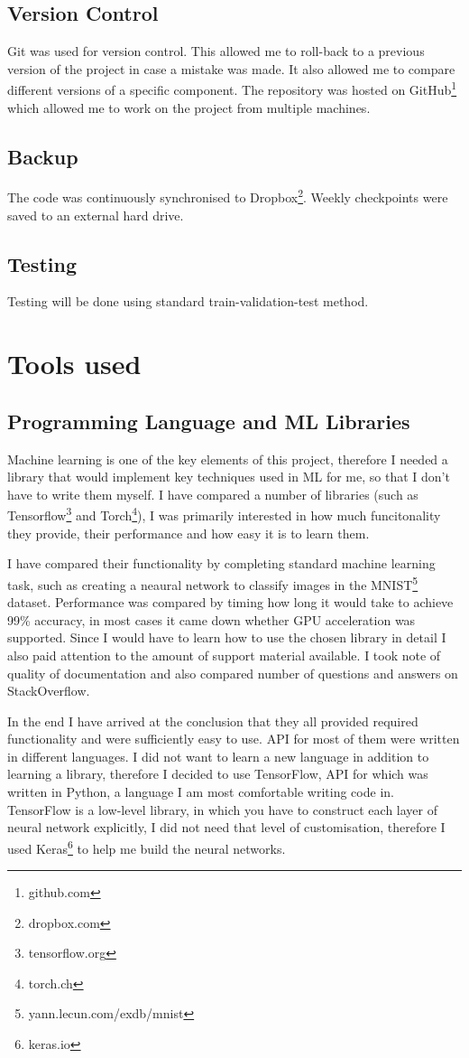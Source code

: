 \documentclass[12pt,a4paper]{book}
\begin{document}
\subsection{Version Control}
Git was used for version control.
This allowed me to roll-back to a previous version of the project in case a mistake was made.
It also allowed me to compare different versions of a specific component.
The repository was hosted on GitHub\footnote{github.com} which allowed me to work on the project from multiple machines.
\subsection{Backup}
The code was continuously synchronised to Dropbox\footnote{dropbox.com}.
Weekly checkpoints were saved to an external hard drive.
\subsection{Testing}
Testing will be done using standard train-validation-test method.
\section{Tools used}
\subsection{Programming Language and ML Libraries}
Machine learning is one of the key elements of this project, therefore I needed a library that would implement key techniques used in ML for me, so that I don't have to write them myself.
I have compared a number of libraries (such as Tensorflow\footnote{tensorflow.org} and Torch\footnote{torch.ch}), I was primarily interested in how much funcitonality they provide, their performance and how easy it is to learn them.

I have compared their functionality by completing standard machine learning task, such as creating a neaural network to classify images in the MNIST\footnote{yann.lecun.com/exdb/mnist} dataset.
Performance was compared by timing how long it would take to achieve 99\% accuracy, in most cases it came down whether GPU acceleration was supported.
Since I would have to learn how to use the chosen library in detail I also paid attention to the amount of support material available.
I took note of quality of documentation and also compared number of questions and answers on StackOverflow.

In the end I have arrived at the conclusion that they all provided required functionality and were sufficiently easy to use.
API for most of them were written in different languages.
I did not want to learn a new language in addition to learning a library, therefore I decided to use TensorFlow, API for which was written in Python, a language I am most comfortable writing code in.
TensorFlow is a low-level library, in which you have to construct each layer of neural network explicitly, I did not need that level of customisation, therefore I used Keras\footnote{keras.io} to help me build the neural networks.
\end{document}
